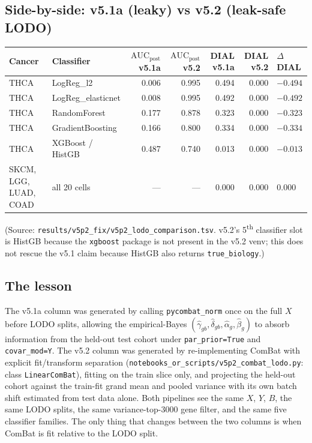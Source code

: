 \documentclass[11pt,a4paper]{article}
\begin{document}
\subsection*{Side-by-side: v5.1a (leaky) vs v5.2 (leak-safe LODO)}
\begin{tabular}{llrrrrl}\toprule
Cancer & Classifier & $\mathrm{AUC}_{\mathrm{post}}$ v5.1a & $\mathrm{AUC}_{\mathrm{post}}$ v5.2 & DIAL v5.1a & DIAL v5.2 & $\Delta$ DIAL \\ \midrule
THCA & LogReg\_l2          & 0.006 & 0.995 & 0.494 & 0.000 & $-0.494$ \\
THCA & LogReg\_elasticnet  & 0.008 & 0.995 & 0.492 & 0.000 & $-0.492$ \\
THCA & RandomForest        & 0.177 & 0.878 & 0.323 & 0.000 & $-0.323$ \\
THCA & GradientBoosting    & 0.166 & 0.800 & 0.334 & 0.000 & $-0.334$ \\
THCA & XGBoost / HistGB    & 0.487 & 0.740 & 0.013 & 0.000 & $-0.013$ \\
SKCM, LGG, LUAD, COAD & all 20 cells & --- & --- & 0.000 & 0.000 & $0.000$ \\
\bottomrule\end{tabular}

(Source: \texttt{results/v5p2\_fix/v5p2\_lodo\_comparison.tsv}.
v5.2's 5\textsuperscript{th} classifier slot is HistGB because the
\texttt{xgboost} package is not present in the v5.2 venv; this does not
rescue the v5.1 claim because HistGB also returns
\texttt{true\_biology}.)

\subsection*{The lesson}
The v5.1a column was generated by calling \texttt{pycombat\_norm} once on
the full $X$ before LODO splits, allowing the empirical-Bayes
$(\hat\gamma_{gb}, \hat\delta_{gb}, \hat\alpha_g, \hat\beta_g)$ to absorb
information from the held-out test cohort under
\texttt{par\_prior=True} and \texttt{covar\_mod=Y}. The v5.2 column was
generated by re-implementing ComBat with explicit fit/transform
separation (\texttt{notebooks\_or\_scripts/v5p2\_combat\_lodo.py}: class
\texttt{LinearComBat}), fitting on the train slice only, and projecting
the held-out cohort against the train-fit grand mean and pooled
variance with its own batch shift estimated from test data alone.
Both pipelines see the same $X$, $Y$, $B$, the same LODO splits, the
same variance-top-3000 gene filter, and the same five classifier
families. The only thing that changes between the two columns is when
ComBat is fit relative to the LODO split.
\end{document}
